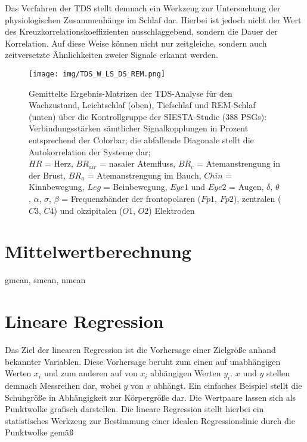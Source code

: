 Das Verfahren der TDS stellt demnach ein Werkzeug zur Untersuchung der physiologischen Zusammenhänge im Schlaf dar. Hierbei ist jedoch nicht der Wert des Kreuzkorrelationskoeffizienten ausschlaggebend, sondern die Dauer der Korrelation. Auf diese Weise können nicht nur zeitgleiche, sondern auch zeitversetzte Ähnlichkeiten zweier Signale erkannt werden. \parencite{bashan_network_2012}

\begin{figure}[H]
	\centering
	\texttt{[image: img/TDS\_W\_LS\_DS\_REM.png]}
	\caption[Ergebnis-Matrizen der \acs{TDS}]{Gemittelte Ergebnis-Matrizen der \acs{TDS}-Analyse für den Wachzustand, Leichtschlaf (oben), Tiefschlaf und \acs{REM}-Schlaf (unten) über die Kontrollgruppe der SIESTA-Studie (388 \acs{PSG}s):\\Verbindungsstärken sämtlicher Signalkopplungen in Prozent entsprechend der Colorbar; die abfallende Diagonale stellt die Autokorrelation der Systeme dar;\\$HR$ = Herz, $BR_{air}$ = nasaler Atemfluss, $BR_c$ = Atemanstrengung in der Brust, $BR_a$ = Atemanstrengung im Bauch, $Chin$ = Kinnbewegung, $Leg$ = Beinbewegung, $Eye1$ und $Eye2$ = Augen, $\delta$, $\theta$, $\alpha$, $\sigma$, $\beta$ = Frequenzbänder der frontopolaren ($Fp1$, $Fp2$), zentralen ($C3$, $C4$) und okzipitalen ($O1$, $O2$) Elektroden}
	\label{fig:TDS_Matrizen}
\end{figure}

\newpage

\section{Mittelwertberechnung}

gmean, smean, nmean

\section{Lineare Regression}

Das Ziel der linearen Regression ist die Vorhersage einer Zielgröße anhand bekannter Variablen. Diese Vorhersage beruht zum einen auf unabhängigen Werten $x_i$ und zum anderen auf von $x_i$ abhängigen Werten $y_i$. $x$ und $y$ stellen demnach Messreihen dar, wobei $y$ von $x$ abhängt. Ein einfaches Beispiel stellt die Schuhgröße in Abhängigkeit zur Körpergröße dar. Die Wertpaare lassen sich als Punktwolke grafisch darstellen. Die lineare Regression stellt hierbei ein statistisches Werkzeug zur Bestimmung einer idealen Regressionslinie durch die Punktwolke gemäß

